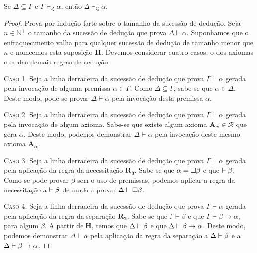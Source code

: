     \vspace{\baselineskip}
    \begin{tcolorbox}[enhanced jigsaw, breakable, sharp corners, colframe=black, colback=white, boxrule=0.5pt, left=1.5mm, right=1.5mm, top=1.5mm, bottom=1.5mm]
    \begin{theorem}[Enfraquecimento]\label{weakening}
        Se $\Delta\subseteq\Gamma$ e $\Gamma\vdash_{\mathfrak{L}}\alpha$, então $\Delta\vdash_{\mathfrak{L}}\alpha$.
        \begin{proof}
            Prova por indução forte sobre o tamanho da sucessão de dedução.
            Seja $n\in\mathbb{N}^+$ o tamanho da sucessão de dedução que prova $\Delta\vdash\alpha$.
            Suponhamos que o enfraquecimento valha para qualquer sucessão de dedução de tamanho menor que $n$ e nomeemos esta suposição $\mathbf{H}$.
            Devemos considerar quatro casos: o dos axiomas e os das demais regras de dedução

            \vspace{0.5\baselineskip}
            \textsc{Caso 1.}
            Seja a linha derradeira da sucessão de dedução que prova $\Gamma\vdash\alpha$ gerada pela invocação de alguma premissa $\alpha\in\Gamma$.
            Como $\Delta\subseteq\Gamma$, sabe-se que $\alpha\in\Delta$.
            Deste modo, pode-se provar $\Delta\vdash\alpha$ pela invocação desta premissa $\alpha$.

            \vspace{.5\baselineskip}
            \textsc{Caso 2.}
            Seja a linha derradeira da sucessão de dedução que prova $\Gamma\vdash\alpha$ gerada pela invocação de algum axioma.
            Sabe-se que existe algum axioma $\mathbf{A_\alpha}\in\mathcal{R}$ que gera $\alpha$.
            Deste modo, podemos demonstrar $\Delta\vdash\alpha$ pela invocação deste mesmo axioma $\mathbf{A_\alpha}$.

            \vspace{.5\baselineskip}
            \textsc{Caso 3.}
            Seja a linha derradeira da sucessão de dedução que prova $\Gamma\vdash\alpha$ gerada pela aplicação da regra da necessitação \hyperref[modal.rule.3]{$\mathbf{R_3}$}.
            Sabe-se que $\alpha=\Box\beta$ e que ${\mathrel{\vdash}\beta}$.
            Como se pode provar $\beta$ sem o uso de premissas, podemos aplicar a regra da necessitação a ${\mathrel{\vdash}\beta}$ de modo a provar ${\Delta\mathrel{\vdash}\Box\beta}$.

            \vspace{.5\baselineskip}
            \textsc{Caso 4.}
            Seja a linha derradeira da sucessão de dedução que prova $\Gamma\vdash\alpha$ gerada pela aplicação da regra da separação \hyperref[modal.rule.2]{$\mathbf{R_2}$}.
            Sabe-se que $\Gamma\vdash\beta$ e que $\Gamma\vdash\beta\to\alpha$, para algum $\beta$.
            A partir de $\mathbf{H}$, temos que $\Delta\mathrel{\vdash}\beta$ e que $\Delta\mathrel{\vdash}\beta\to\alpha$.
            Deste modo, podemos demonstrar $\Delta\vdash\alpha$ pela aplicação da regra da separação a $\Delta\mathrel{\vdash}\beta$ e a $\Delta\mathrel{\vdash}\beta\to\alpha$.


\end{proof}
\end{theorem}
\end{tcolorbox}
